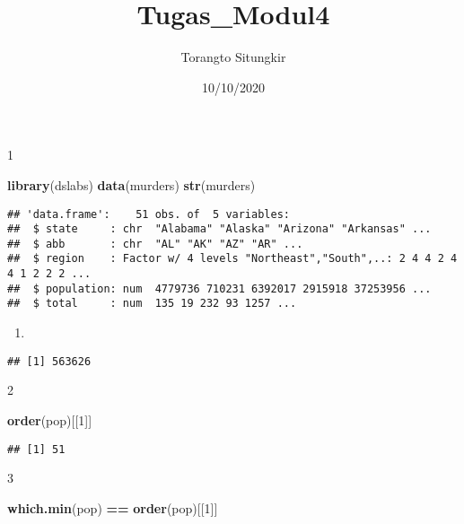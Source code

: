 \documentclass[
]{article}
\title{Tugas\_Modul4}
\author{Torangto Situngkir}
\date{10/10/2020}
\newenvironment{Shaded}{\begin{snugshade}}{\end{snugshade}}
\newcommand{\DecValTok}[1]{\textcolor[rgb]{0.00,0.00,0.81}{#1}}
\newcommand{\KeywordTok}[1]{\textcolor[rgb]{0.13,0.29,0.53}{\textbf{#1}}}
\newcommand{\NormalTok}[1]{#1}
\newcommand{\OperatorTok}[1]{\textcolor[rgb]{0.81,0.36,0.00}{\textbf{#1}}}
\newcommand{\StringTok}[1]{\textcolor[rgb]{0.31,0.60,0.02}{#1}}
\begin{document}
\maketitle

1

\begin{Shaded}
\begin{Highlighting}[]
\KeywordTok{library}\NormalTok{(dslabs)}
\KeywordTok{data}\NormalTok{(murders)}
\KeywordTok{str}\NormalTok{(murders)}
\end{Highlighting}
\end{Shaded}

\begin{verbatim}
## 'data.frame':    51 obs. of  5 variables:
##  $ state     : chr  "Alabama" "Alaska" "Arizona" "Arkansas" ...
##  $ abb       : chr  "AL" "AK" "AZ" "AR" ...
##  $ region    : Factor w/ 4 levels "Northeast","South",..: 2 4 4 2 4 4 1 2 2 2 ...
##  $ population: num  4779736 710231 6392017 2915918 37253956 ...
##  $ total     : num  135 19 232 93 1257 ...
\end{verbatim}

\begin{enumerate}
\def\labelenumi{\arabic{enumi}.}
\item
\end{enumerate}

\begin{Shaded}
\end{Shaded}

\begin{verbatim}
## [1] 563626
\end{verbatim}

2

\begin{Shaded}
\begin{Highlighting}[]
  \KeywordTok{order}\NormalTok{(pop)[[}\DecValTok{1}\NormalTok{]]}
\end{Highlighting}
\end{Shaded}

\begin{verbatim}
## [1] 51
\end{verbatim}

3

\begin{Shaded}
\begin{Highlighting}[]
  \KeywordTok{which.min}\NormalTok{(pop) }\OperatorTok{==}\StringTok{ }\KeywordTok{order}\NormalTok{(pop)[[}\DecValTok{1}\NormalTok{]]}
\end{Highlighting}
\end{Shaded}
\end{document}

